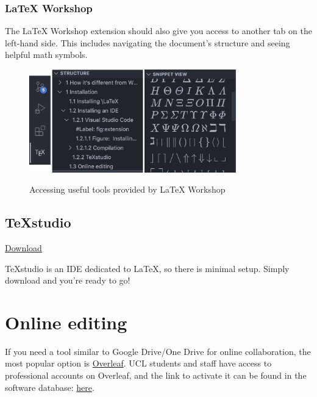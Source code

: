\subsubsection{LaTeX Workshop}
The LaTeX Workshop extension should also give you access to another tab on the left-hand side.
This includes navigating the document's structure and seeing helpful math symbols.
\begin{figure}[h]
\centering
    \includegraphics[width=0.8\textwidth]{figures/symbols.png}
\label{fig:symbols}
\caption{Accessing useful tools provided by LaTeX Workshop}
\end{figure}

\subsection{TeXstudio}
\href{https://www.texstudio.org/}{Download}

TeXstudio is an IDE dedicated to \LaTeX{}, so there is minimal setup. Simply download and you're ready to go!

\section{Online editing}
If you need a tool similar to Google Drive/One Drive for online collaboration, the most popular option is \href{https://www.overleaf.com/}{Overleaf}.
UCL students and staff have access to professional accounts on Overleaf, and the link to activate it can be found in the software database: \href{https://swdb.ucl.ac.uk/package/view/id/1235}{here}.